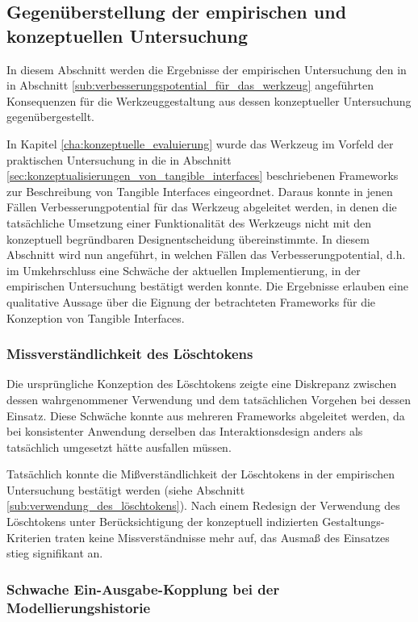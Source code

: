 \subsection{Gegenüberstellung der empirischen und konzeptuellen Untersuchung}
\label{sub:gegenüberstellung}

In diesem Abschnitt werden die Ergebnisse der empirischen Untersuchung den in in Abschnitt \ref{sub:verbesserungspotential_für_das_werkzeug} angeführten Konsequenzen für die Werkzeuggestaltung aus dessen konzeptueller Untersuchung gegenübergestellt.

In Kapitel \ref{cha:konzeptuelle_evaluierung} wurde das Werkzeug im Vorfeld der praktischen Untersuchung in die in Abschnitt \ref{sec:konzeptualisierungen_von_tangible_interfaces} beschriebenen Frameworks zur Beschreibung von Tangible Interfaces eingeordnet. Daraus konnte in jenen Fällen Verbesserungpotential für das Werkzeug abgeleitet werden, in denen die tatsächliche Umsetzung einer Funktionalität des Werkzeugs nicht mit den konzeptuell begründbaren Designentscheidung übereinstimmte. In diesem Abschnitt wird nun angeführt, in welchen Fällen das Verbesserungpotential, d.h. im Umkehrschluss eine Schwäche der aktuellen Implementierung, in der empirischen Untersuchung bestätigt werden konnte. Die Ergebnisse erlauben eine qualitative Aussage über die Eignung der betrachteten Frameworks für die Konzeption von Tangible Interfaces.

\subsubsection{Missverständlichkeit des Löschtokens}

Die ursprüngliche Konzeption des Löschtokens zeigte eine Diskrepanz zwischen dessen wahrgenommener Verwendung und dem tatsächlichen Vorgehen bei dessen Einsatz. Diese Schwäche konnte aus mehreren Frameworks abgeleitet werden, da bei konsistenter Anwendung derselben das Interaktionsdesign anders als tatsächlich umgesetzt hätte ausfallen müssen.

Tatsächlich konnte die Mißverständlichkeit der Löschtokens in der empirischen Untersuchung bestätigt werden (siehe Abschnitt \ref{sub:verwendung_des_löschtokens}). Nach einem Redesign der Verwendung des Löschtokens unter Berücksichtigung der konzeptuell indizierten Gestaltungs-Kriterien traten keine Missverständnisse mehr auf, das Ausmaß des Einsatzes stieg signifikant an.


\subsubsection{Schwache Ein-Ausgabe-Kopplung bei der Modellierungshistorie}


